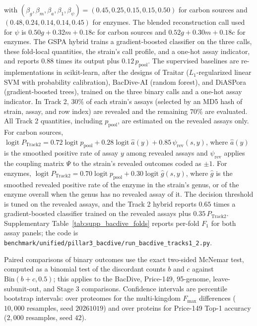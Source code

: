 \documentclass[10pt]{article}
\newcommand{\fn}[1]{\nolinkurl{#1}}
\begin{document}
with $(\beta_g, \beta_m, \beta_a, \beta_1, \beta_\psi) = (0.45, 0.25, 0.15, 0.15, 0.50)$ for carbon sources and $(0.48, 0.24, 0.14, 0.14, 0.45)$ for enzymes. The blended reconstruction call used for $\psi$ is $0.50g + 0.32m + 0.18c$ for carbon sources and $0.52g + 0.30m + 0.18c$ for enzymes. The GSPA hybrid trains a gradient-boosted classifier on the three calls, these fold-local quantities, the strain's call profile, and a one-hot assay indicator, and reports $0.88$ times its output plus $0.12\,p_{\text{pool}}$. The supervised baselines are re-implementations in scikit-learn, after the designs of Traitar ($L_1$-regularized linear SVM with probability calibration), BacDive-AI (random forest), and DiASPora (gradient-boosted trees), trained on the three binary calls and a one-hot assay indicator. In Track 2, $30\%$ of each strain's assays (selected by an MD5 hash of strain, assay, and row index) are revealed and the remaining $70\%$ are evaluated. All Track 2 quantities, including $p_{\text{pool}}$, are estimated on the revealed assays only. For carbon sources, $\operatorname{logit} P_{\text{Track2}} = 0.72 \operatorname{logit} p_{\text{pool}} + 0.28 \operatorname{logit} \hat{a}(y) + 0.85\,\psi_{\text{rev}}(s, y)$, where $\hat{a}(y)$ is the smoothed positive rate of assay $y$ among revealed assays and $\psi_{\text{rev}}$ applies the coupling matrix $\Psi$ to the strain's revealed outcomes coded as $\pm 1$. For enzymes, $\operatorname{logit} P_{\text{Track2}} = 0.70 \operatorname{logit} p_{\text{pool}} + 0.30 \operatorname{logit} \hat{g}(s, y)$, where $\hat{g}$ is the smoothed revealed positive rate of the enzyme in the strain's genus, or of the enzyme overall when the genus has no revealed assay of it. The decision threshold is tuned on the revealed assays, and the Track 2 hybrid reports $0.65$ times a gradient-boosted classifier trained on the revealed assays plus $0.35\,P_{\text{Track2}}$. Supplementary Table~\ref{tab:supp_bacdive_folds} reports per-fold $F_1$ for both assay panels; the code is \fn{benchmark/unified/pillar3_bacdive/run_bacdive_tracks1_2.py}.

Paired comparisons of binary outcomes use the exact two-sided McNemar test, computed as a binomial test of the discordant counts $b$ and $c$ against $\text{Bin}(b + c, 0.5)$; this applies to the BacDive, Price-149, 95-genome, leave-subunit-out, and Stage 3 comparisons. Confidence intervals are percentile bootstrap intervals: over proteomes for the multi-kingdom $F_{\max}$ differences ($10{,}000$ resamples, seed $20261019$) and over proteins for Price-149 Top-1 accuracy ($2{,}000$ resamples, seed $42$).
\end{document}
